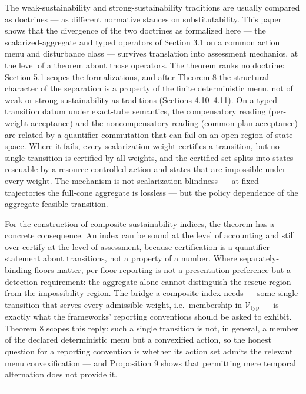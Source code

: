 \documentclass[11pt]{article}
\begin{document}
The weak-sustainability and strong-sustainability traditions are usually
compared as doctrines --- as different normative stances on
substitutability. This paper shows that the divergence of the two
doctrines as formalized here --- the scalarized-aggregate and typed
operators of Section 3.1 on a common action menu and disturbance class
--- survives translation into assessment mechanics, at the level of a
theorem about those operators. The theorem ranks no doctrine: Section
5.1 scopes the formalizations, and after Theorem 8 the structural
character of the separation is a property of the finite deterministic
menu, not of weak or strong sustainability as traditions (Sections
4.10--4.11). On a typed transition datum under exact-tube semantics, the
compensatory reading (per-weight acceptance) and the noncompensatory
reading (common-plan acceptance) are related by a quantifier commutation
that can fail on an open region of state space. Where it fails, every
scalarization weight certifies a transition, but no single transition is
certified by all weights, and the certified set splits into states
rescuable by a resource-controlled action and states that are impossible
under every weight. The mechanism is not scalarization blindness --- at
fixed trajectories the full-cone aggregate is lossless --- but the
policy dependence of the aggregate-feasible transition.

For the construction of composite sustainability indices, the theorem
has a concrete consequence. An index can be sound at the level of
accounting and still over-certify at the level of assessment, because
certification is a quantifier statement about transitions, not a
property of a number. Where separately-binding floors matter, per-floor
reporting is not a presentation preference but a detection requirement:
the aggregate alone cannot distinguish the rescue region from the
impossibility region. The bridge a composite index needs --- some single
transition that serves every admissible weight, i.e.~membership in
\(\mathcal{V}_{\mathrm{typ}}\) --- is exactly what the frameworks'
reporting conventions should be asked to exhibit. Theorem 8 scopes this
reply: such a single transition is not, in general, a member of the
declared deterministic menu but a convexified action, so the honest
question for a reporting convention is whether its action set admits the
relevant menu convexification --- and Proposition 9 shows that
permitting mere temporal alternation does not provide it.

\begin{center}\rule{0.5\linewidth}{0.5pt}\end{center}
\end{document}
